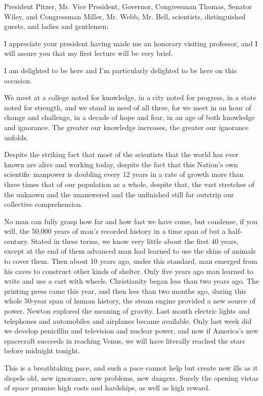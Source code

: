 \documentclass[a4paper]{amsbook}
\begin{document}
\vspace{10 mm}

President Pitzer, Mr. Vice President, Governor, Congressman Thomas, Senator Wiley, and Congressman Miller, Mr. Webb, Mr. Bell, scientists, distinguished guests, and ladies and gentlemen:

I appreciate your president having made me an honorary visiting professor, and I will assure you that my first lecture will be very brief.

I am delighted to be here and I'm particularly delighted to be here on this occasion.

We meet at a college noted for knowledge, in a city noted for progress, in a state noted for strength, and we stand in need of all three, for we meet in an hour of change and challenge, in a decade of hope and fear, in an age of both knowledge and ignorance. The greater our knowledge increases, the greater our ignorance unfolds.

Despite the striking fact that most of the scientists that the world has ever known are alive and working today, despite the fact that this Nation's own scientific manpower is doubling every 12 years in a rate of growth more than three times that of our population as a whole, despite that, the vast stretches of the unknown and the unanswered and the unfinished still far outstrip our collective comprehension.

No man can fully grasp how far and how fast we have come, but condense, if you will, the 50,000 years of man's recorded history in a time span of but a half-century. Stated in these terms, we know very little about the first 40 years, except at the end of them advanced man had learned to use the skins of animals to cover them. Then about 10 years ago, under this standard, man emerged from his caves to construct other kinds of shelter. Only five years ago man learned to write and use a cart with wheels. Christianity began less than two years ago. The printing press came this year, and then less than two months ago, during this whole 50-year span of human history, the steam engine provided a new source of power. Newton explored the meaning of gravity. Last month electric lights and telephones and automobiles and airplanes became available. Only last week did we develop penicillin and television and nuclear power, and now if America's new spacecraft succeeds in reaching Venus, we will have literally reached the stars before midnight tonight.

This is a breathtaking pace, and such a pace cannot help but create new ills as it dispels old, new ignorance, new problems, new dangers. Surely the opening vistas of space promise high costs and hardships, as well as high reward.
\end{document}
